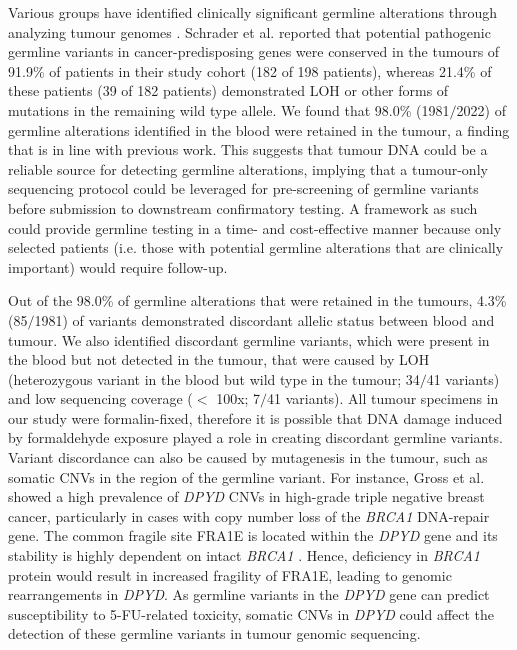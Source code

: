 Various groups have identified clinically significant germline alterations through analyzing tumour genomes \cite{Schrader2015, Meric-Bernstam2016, Jones2015a, WcWhinney2009}. Schrader et al. \cite{Schrader2015} reported that potential pathogenic germline variants in cancer-predisposing genes were conserved in the tumours of 91.9\% of patients in their study cohort (182 of 198 patients), whereas 21.4\% of these patients (39 of 182 patients) demonstrated LOH or other forms of mutations in the remaining wild type allele. We found that 98.0\% (1981$/$2022) of germline alterations identified in the blood were retained in the tumour, a finding that is in line with previous work. This suggests that tumour DNA could be a reliable source for detecting germline alterations, implying that a tumour-only sequencing protocol could be leveraged for pre-screening of germline variants before submission to downstream confirmatory testing. A framework as such could provide germline testing in a time- and cost-effective manner because only selected patients (i.e. those with potential germline alterations that are clinically important) would require follow-up.

Out of the 98.0\% of germline alterations that were retained in the tumours, 4.3\% (85$/$1981) of variants demonstrated discordant allelic status between blood and tumour. We also identified discordant germline variants, which were present in the blood but not detected in the tumour, that were caused by LOH (heterozygous variant in the blood but wild type in the tumour; 34$/$41 variants) and low sequencing coverage ($<$ 100x; 7$/$41 variants). All tumour specimens in our study were formalin-fixed, therefore it is possible that DNA damage induced by formaldehyde exposure played a role in creating discordant germline variants. Variant discordance can also be caused by mutagenesis in the tumour, such as somatic CNVs in the region of the germline variant. For instance, Gross et al. \cite{Gross2013} showed a high prevalence of \textit{DPYD} CNVs in high-grade triple negative breast cancer, particularly in cases with copy number loss of the \textit{BRCA1} DNA-repair gene. The common fragile site FRA1E is located within the \textit{DPYD} gene and its stability is highly dependent on intact \textit{BRCA1} \cite{Arlt2004}. Hence, deficiency in \textit{BRCA1} protein would result in increased fragility of FRA1E, leading to genomic rearrangements in \textit{DPYD}. As germline variants in the \textit{DPYD} gene can predict susceptibility to 5-FU-related toxicity, somatic CNVs in \textit{DPYD} could affect the detection of these germline variants in tumour genomic sequencing.

